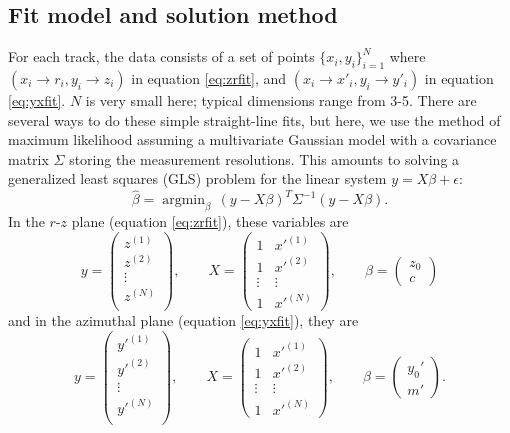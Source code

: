 \documentclass[12pt]{article}
\DeclareMathOperator*{\argmin}{argmin}
\begin{document}
\subsection{Fit model and solution method} \label{sec:lsq}
 For each track, the data consists of a set of points $\{x_i,y_i\}_{i=1}^N$ where $(x_i \to r_i, y_i \to z_i)$ in equation \ref{eq:zrfit}, and $(x_i \to x'_i, y_i \to y'_i)$ in equation \ref{eq:yxfit}. $N$ is very small here; typical dimensions range from 3-5. There are several ways to do these simple straight-line fits, but here, we use the method of maximum likelihood assuming a multivariate Gaussian model with a covariance matrix $\Sigma$ storing the measurement resolutions. This amounts to solving a generalized least squares (GLS) problem for the linear system $y = X\beta + \epsilon$:
 \begin{equation}\label{eq:gls}
 \hat\beta = \argmin_{\beta} \, (y - X\beta)^T \Sigma^{-1} (y - X\beta).
 \end{equation}
In the $r$-$z$ plane (equation \ref{eq:zrfit}), these variables are
\begin{equation} \label{eq:rzmat}
y = 
 \begin{pmatrix}
 z^{(1)}\\
 z^{(2)}\\
 \vdots \\
 z^{(N)}\\
 \end{pmatrix},
 \qquad
X =
 \begin{pmatrix}
  1 & x'^{(1)} \\
  1 & x'^{(2)} \\
  \vdots  & \vdots \\
  1 & x'^{(N)} 
 \end{pmatrix},
 \qquad
\beta = 
 \begin{pmatrix}
 z_0\\
 c
 \end{pmatrix}
\end{equation}
and in the azimuthal plane (equation \ref{eq:yxfit}), they are
\begin{equation} \label{eq:xymat}
y = 
 \begin{pmatrix}
 y'^{(1)}\\
 y'^{(2)}\\
 \vdots \\
 y'^{(N)}\\
 \end{pmatrix},
 \qquad
X =
 \begin{pmatrix}
  1 & x'^{(1)} \\
  1 & x'^{(2)} \\
  \vdots  & \vdots \\
  1 & x'^{(N)} 
 \end{pmatrix},
 \qquad
\beta = 
 \begin{pmatrix}
 y_0'\\
 m'
 \end{pmatrix}.
\end{equation}
\end{document}
